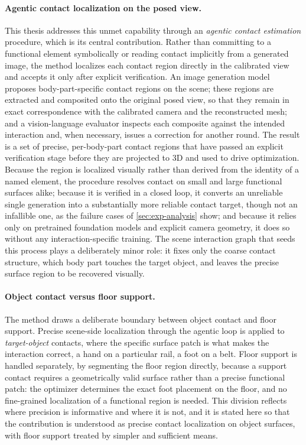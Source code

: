 \paragraph{Agentic contact localization on the posed view.} This thesis addresses this unmet capability through an \emph{agentic contact estimation} procedure, which is its central contribution. Rather than committing to a functional element symbolically or reading contact implicitly from a generated image, the method localizes each contact region directly in the calibrated view and accepts it only after explicit verification. An image generation model proposes body-part-specific contact regions on the scene; these regions are extracted and composited onto the original posed view, so that they remain in exact correspondence with the calibrated camera and the reconstructed mesh; and a vision-language evaluator inspects each composite against the intended interaction and, when necessary, issues a correction for another round. The result is a set of precise, per-body-part contact regions that have passed an explicit verification stage before they are projected to 3D and used to drive optimization. Because the region is localized visually rather than derived from the identity of a named element, the procedure resolves contact on small and large functional surfaces alike; because it is verified in a closed loop, it converts an unreliable single generation into a substantially more reliable contact target, though not an infallible one, as the failure cases of \cref{sec:exp-analysis} show; and because it relies only on pretrained foundation models and explicit camera geometry, it does so without any interaction-specific training. The scene interaction graph that seeds this process plays a deliberately minor role: it fixes only the coarse contact structure, which body part touches the target object, and leaves the precise surface region to be recovered visually.

\paragraph{Object contact versus floor support.} The method draws a deliberate boundary between object contact and floor support. Precise scene-side localization through the agentic loop is applied to \emph{target-object} contacts, where the specific surface patch is what makes the interaction correct, a hand on a particular rail, a foot on a belt. Floor support is handled separately, by segmenting the floor region directly, because a support contact requires a geometrically valid surface rather than a precise functional patch: the optimizer determines the exact foot placement on the floor, and no fine-grained localization of a functional region is needed. This division reflects where precision is informative and where it is not, and it is stated here so that the contribution is understood as precise contact localization on object surfaces, with floor support treated by simpler and sufficient means.

